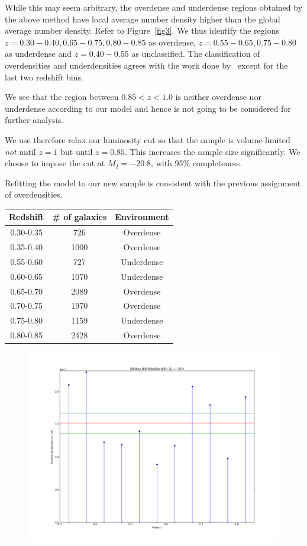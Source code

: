 \documentclass[twocolumn,useAMS,usenatbib]{mn2e}
\begin{document}
While this may seem arbitrary, the overdense and underdense regions obtained by the above method have local average number density higher than the global average number density. Refer to Figure~\ref{fig3}.
We thus identify the regions $z=0.30-0.40, 0.65-0.75, 0.80-0.85$ as overdense, $z=0.55-0.65, 0.75-0.80$ as underdense and $z=0.40-0.55$ as unclassified.
The classification of overdensities and underdensities agrees with the work done by~\cite{Kovac_Density10k} except for the last two redshift bins. 

We see that the region between $0.85<z<1.0$ is neither overdense nor underdense according to our model and hence is not going to be considered for further analysis.

We use therefore relax our luminosity cut %
so that the sample is volume-limited \emph{not} until $z=1$ but until $z=0.85$. This increases the sample size significantly.
We choose to impose the cut at $M_I=-20.8$, with 95\% completeness. 

Refitting the model to our new sample is consistent with the previous assignment of overdensities.


\begin{tabular}{c|c|c|}
 \hline
 Redshift & \# of galaxies & Environment \\
 \hline
 0.30-0.35 & 726 & Overdense \\
 0.35-0.40 & 1000 & Overdense \\
 0.55-0.60 & 727 & Underdense \\
 0.60-0.65 & 1070 & Underdense \\
 0.65-0.70 & 2089 & Overdense \\
 0.70-0.75 & 1970 & Overdense \\
 0.75-0.80 & 1159 & Underdense \\
 0.80-0.85 & 2428 & Overdense \\
 \hline
\end{tabular}

\begin{figure}
 \centering
 \includegraphics[width=\columnwidth]{../plots_20140219/comoving_densities(2b).png}
 \label{fig:comoving_densities}
 \caption{}
\end{figure}
\end{document}

